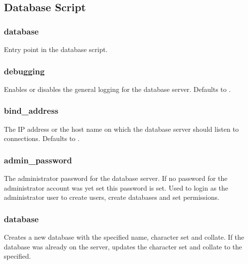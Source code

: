 \subsection{Database Script}

\subsubsection{database}


Entry point in the database script.

\subsubsection{debugging}


Enables or disables the general logging for the database server.
Defaults to \literalfalse.

\subsubsection{bind\_address}


The IP address or the host name on which the database server should listen
to connections. Defaults to .

\subsubsection{admin\_password}


The administrator password for the database server. If no password for
the administrator account was yet set this password is set. Used to login as
the administrator user to create users, create databases and set permissions.

\subsubsection{database}


Creates a new database with the specified name, character set and collate.
If the database was already on the server, updates the character set and collate
to the specified.

